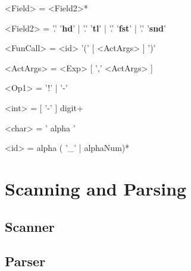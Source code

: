 \documentclass{article}
\begin{document}
\begin{grammar}
<Field> = <Field2>*

<Field2> = '.' '\textbf{hd}' | '.' '\textbf{tl}' | '.' '\textbf{fst}' | '.' '\textbf{snd}'

<FunCall> = <id> '(' [ <ActArgs> ] ')'

<ActArgs> = <Exp> [ ',' <ActArgs> ]

<Op1> = '!' | '-'

<int> = [ '-' ] digit+

<char> = ' alpha '

<id> = alpha ( '\_' | alphaNum)*
\end{grammar}

\section{Scanning and Parsing}
\subsection{Scanner}

\subsection{Parser}
\end{document}
